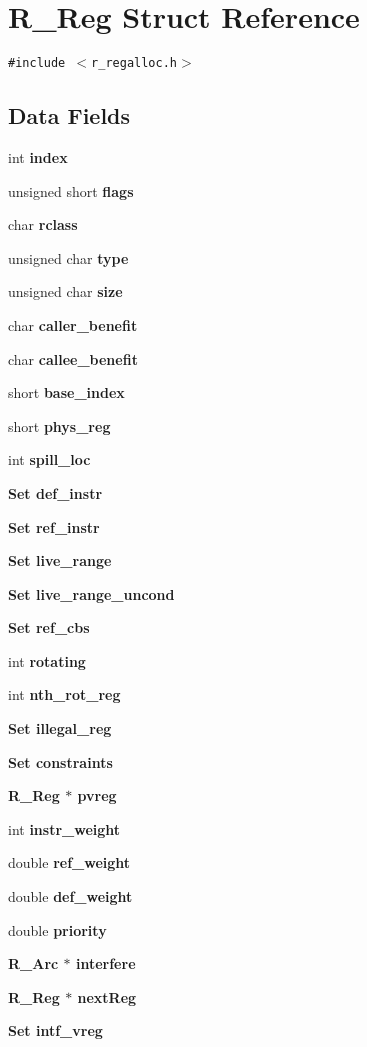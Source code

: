 \section{R\_\-Reg Struct Reference}
\label{structR__Reg}
{\tt \#include $<$r\_\-regalloc.h$>$}

\subsection*{Data Fields}
\begin{CompactItemize}
\item 
int \bf{index}
\item 
unsigned short \bf{flags}
\item 
char \bf{rclass}
\item 
unsigned char \bf{type}
\item 
unsigned char \bf{size}
\item 
char \bf{caller\_\-benefit}
\item 
char \bf{callee\_\-benefit}
\item 
short \bf{base\_\-index}
\item 
short \bf{phys\_\-reg}
\item 
int \bf{spill\_\-loc}
\item 
\bf{Set} \bf{def\_\-instr}
\item 
\bf{Set} \bf{ref\_\-instr}
\item 
\bf{Set} \bf{live\_\-range}
\item 
\bf{Set} \bf{live\_\-range\_\-uncond}
\item 
\bf{Set} \bf{ref\_\-cbs}
\item 
int \bf{rotating}
\item 
int \bf{nth\_\-rot\_\-reg}
\item 
\bf{Set} \bf{illegal\_\-reg}
\item 
\bf{Set} \bf{constraints}
\item 
\bf{R\_\-Reg} $\ast$ \bf{pvreg}
\item 
int \bf{instr\_\-weight}
\item 
double \bf{ref\_\-weight}
\item 
double \bf{def\_\-weight}
\item 
double \bf{priority}
\item 
\bf{R\_\-Arc} $\ast$ \bf{interfere}
\item 
\bf{R\_\-Reg} $\ast$ \bf{next\-Reg}
\item 
\bf{Set} \bf{intf\_\-vreg}
\end{CompactItemize}


